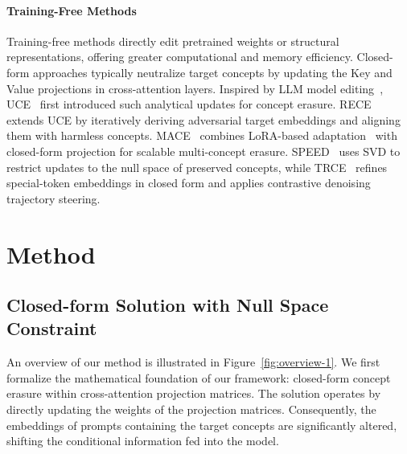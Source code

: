 \documentclass[letterpaper]{article} %
\begin{document}
\paragraph{Training-Free Methods}
Training-free methods directly edit pretrained weights or structural representations, offering greater computational and memory efficiency. Closed-form approaches typically neutralize target concepts by updating the Key and Value projections in cross-attention layers. Inspired by LLM model editing~\cite{MEMIT,LLM}, UCE~\cite{UCE} first introduced such analytical updates for concept erasure. RECE~\cite{RECE} extends UCE by iteratively deriving adversarial target embeddings and aligning them with harmless concepts. MACE~\cite{MACE} combines LoRA-based adaptation~\cite{lora} with closed-form projection for scalable multi-concept erasure. SPEED~\cite{SPEED} uses SVD to restrict updates to the null space of preserved concepts, while TRCE~\cite{TRCE} refines special-token embeddings in closed form and applies contrastive denoising trajectory steering.






\section{Method}
\subsection{Closed-form Solution with Null Space Constraint} An overview of our method is illustrated in Figure~\ref{fig:overview-1}. We first formalize the mathematical foundation of our framework: closed-form concept erasure within cross-attention projection matrices. The solution operates by directly updating the weights of the projection matrices. Consequently, the embeddings of prompts containing the target concepts are significantly altered, shifting the conditional information fed into the model.
\end{document}

